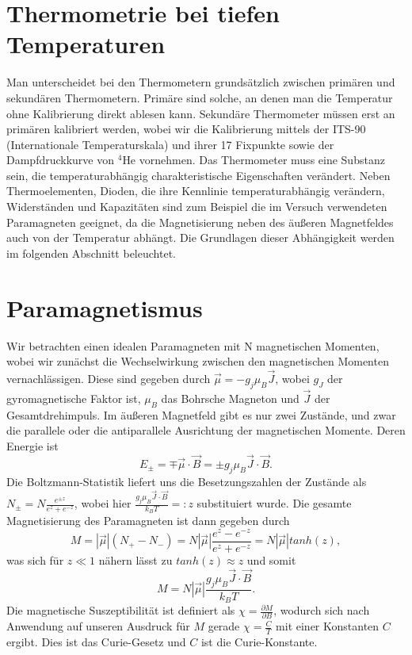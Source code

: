 \documentclass[bigchapter,colorback,accentcolor=tud4b,linedtoc,11pt]{tudreport}
\begin{document}
\section{Thermometrie bei tiefen Temperaturen}

Man unterscheidet bei den Thermometern grundsätzlich zwischen primären und sekundären Thermometern. Primäre sind solche, an denen man die Temperatur ohne Kalibrierung direkt ablesen kann. Sekundäre Thermometer müssen erst an primären kalibriert werden, wobei wir die Kalibrierung mittels der ITS-90 (Internationale Temperaturskala) und ihrer 17 Fixpunkte sowie der Dampfdruckkurve von $^4$He vornehmen. Das Thermometer muss eine Substanz sein, die temperaturabhängig charakteristische Eigenschaften verändert. Neben Thermoelementen, Dioden, die ihre Kennlinie temperaturabhängig verändern, Widerständen und Kapazitäten sind zum Beispiel die im Versuch verwendeten Paramagneten geeignet, da die Magnetisierung neben des äußeren Magnetfeldes auch von der Temperatur abhängt. Die Grundlagen dieser Abhängigkeit werden im folgenden Abschnitt beleuchtet.

\section{Paramagnetismus}

Wir betrachten einen idealen Paramagneten mit N magnetischen Momenten, wobei wir zunächst die Wechselwirkung zwischen den magnetischen Momenten vernachlässigen. Diese sind gegeben durch $\vec{\mu} = -g_j \mu_B \vec{J}$, wobei $g_J$ der gyromagnetische Faktor ist, $\mu_B$ das Bohrsche Magneton und $\vec{J}$ der Gesamtdrehimpuls. Im äußeren Magnetfeld gibt es nur zwei Zustände, und zwar die parallele oder die antiparallele Ausrichtung der magnetischen Momente. Deren Energie ist
$$E_{\pm} = \mp \vec{\mu} \cdot \vec{B} = \pm g_j \mu_B \vec{J} \cdot \vec{B}.$$
Die Boltzmann-Statistik liefert uns die Besetzungszahlen der Zustände als $N_{\pm} = N \frac{e^{\pm z}}{e^z + e^{-z}}$, wobei hier $\frac{g_j \mu_B \vec{J} \cdot \vec{B}}{k_B T} =: z$ substituiert wurde. Die gesamte Magnetisierung des Paramagneten ist dann gegeben durch 
$$M = |\vec{\mu}| (N_+ - N_-) = N |\vec{\mu}| \frac{e^z - e^{-z}}{e^z + e^{-z}} = N |\vec{\mu}| tanh(z) ,$$ was sich für $z \ll 1$ nähern lässt zu $tanh(z) \approx z$ und somit 
$$M = N |\vec{\mu}| \frac{g_j \mu_B \vec{J} \cdot \vec{B}}{k_B T}.$$
Die magnetische Suszeptibilität ist definiert als $\chi = \frac{\partial M}{\partial B}$, wodurch sich nach Anwendung auf unseren Ausdruck für $M$ gerade $\chi = \frac{C}{T}$ mit einer Konstanten $C$ ergibt. Dies ist das Curie-Gesetz und $C$ ist die Curie-Konstante.
\end{document}
